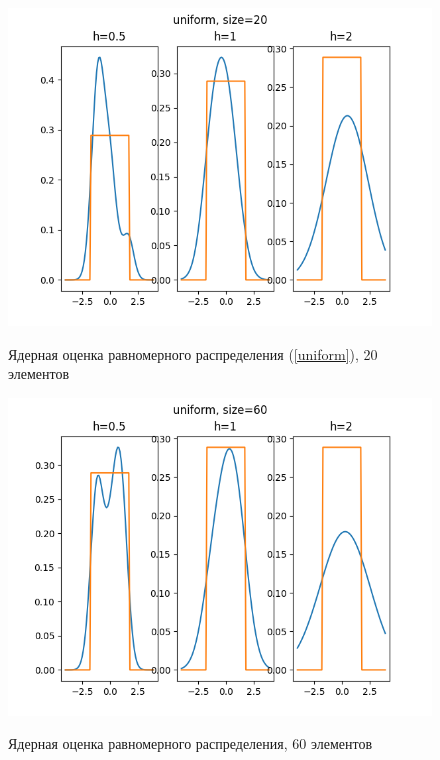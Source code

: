 \documentclass[12pt,a4paper]{article}
\begin{document}
			\begin{figure}[htp]
				{\includegraphics[width=1\linewidth]{../plots/uniform_20.png}}
				\caption{Ядерная оценка равномерного распределения (\ref{uniform}), 20 элементов}
			\end{figure}
			\begin{figure}
				{\includegraphics[width=1\linewidth]{../plots/uniform_60.png}}
				\caption{Ядерная оценка равномерного распределения, 60 элементов}
			\end{figure}
			\clearpage
			\newpage
			
\end{document}
